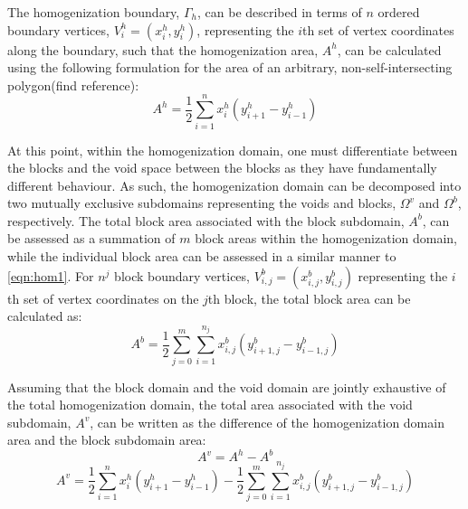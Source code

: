 
The homogenization boundary, $\Gamma_{h}$, can be described in terms
of $n$ ordered boundary vertices, $V_{i}^{h}=(x_{i}^{h},y_{i}^{h})$,
representing the $i$th set of vertex coordinates along the boundary,
such that the homogenization area, $A^{h}$, can be calculated using
the following formulation for the area of an arbitrary, non-self-intersecting
polygon(find reference): 
\begin{equation}
A^{h}=\dfrac{1}{2}\sum_{i=1}^{n}x_{i}^{h}(y_{i+1}^{h}-y_{i-1}^{h})
\label{eqn:hom1}
\end{equation}

At this point, within the homogenization domain, one must differentiate 
between the blocks and the void space between the blocks as they have
fundamentally different behaviour. As such, the homogenization domain
can be decomposed into two mutually exclusive subdomains representing
the voids and blocks, $\Omega^{v}$ and $\Omega^{b}$, respectively.
The total block area associated with the block subdomain, $A^{b}$,
can be assessed as a summation of $m$ block areas within the homogenization
domain, while the individual block area can be assessed in a similar
manner to \ref{eqn:hom1}. For $n^{j}$ block boundary vertices, $V_{i,j}^{b}=(x_{i,j}^{b},y_{i,j}^{b})$
representing the $i$th set of vertex coordinates on the $j$th block,
the total block area can be calculated as: 
\begin{equation}
A^{b}=\dfrac{1}{2}\sum_{j=0}^{m}\sum_{i=1}^{n_{j}}x_{i,j}^{b}(y_{i+1,j}^{b}-y_{i-1,j}^{b})\label{eqn:hom2}
\end{equation}


Assuming that the block domain and the void domain are jointly exhaustive
of the total homogenization domain, the total area associated with
the void subdomain, $A^{v}$, can be written as the difference of
the homogenization domain area and the block subdomain area: 
\begin{equation}
A^{v}=A^{h}-A^{b}\label{eqn:hom3}
\end{equation}
\begin{equation}
A^{v}=\dfrac{1}{2}\sum_{i=1}^{n}x_{i}^{h}(y_{i+1}^{h}-y_{i-1}^{h})-\dfrac{1}{2}\sum_{j=0}^{m}\sum_{i=1}^{n_{j}}x_{i,j}^{b}(y_{i+1,j}^{b}-y_{i-1,j}^{b})\label{eqn:hom4}
\end{equation}
